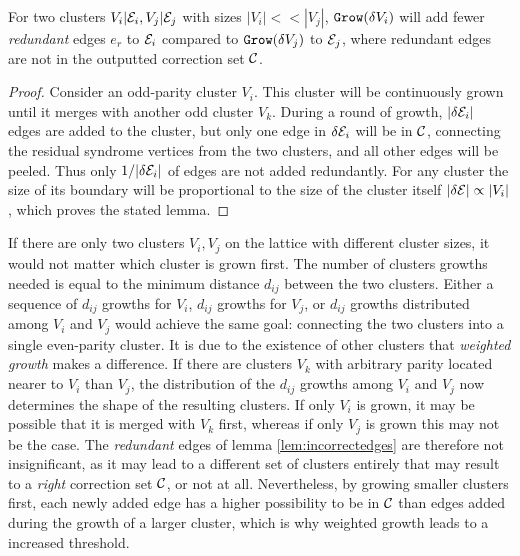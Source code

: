 

\begin{lemma}\label{lem:incorrectedges}
  For two clusters $V_i|\mathcal{E}_i, V_j|\mathcal{E}_j$ with sizes $|V_i| << |V_j|$, $\texttt{Grow}(\delta V_i)$ will add fewer \emph{redundant} edges $e_r$ to $\mathcal{E}_i$ compared to $\texttt{Grow}(\delta V_j)$ to $\mathcal{E}_j$, where redundant edges are not in the outputted correction set $\mathcal{C}$. 
\end{lemma}
\begin{proof}
  Consider an odd-parity cluster $V_i$. This cluster will be continuously grown until it merges with another odd cluster $V_k$. 
  During a round of growth, $|\delta \mathcal{E}_i|$ edges are added to the cluster, but only one edge in $\delta \mathcal{E}_i$ will be in $\mathcal{C}$, connecting the residual syndrome vertices from the two clusters, and all other edges will be peeled. Thus only $1/|\delta \mathcal{E}_i|$ of edges are not added redundantly. For any cluster the size of its boundary will be proportional to the size of the cluster itself $|\delta \mathcal{E}| \propto |V_i|$, which proves the stated lemma. 
\end{proof}

If there are only two clusters $V_i, V_j$ on the lattice with different cluster sizes, it would not matter which cluster is grown first. The number of clusters growths needed is equal to the minimum distance $d_{ij}$ between the two clusters. Either a sequence of $d_{ij}$ growths for $V_i$, $d_{ij}$ growths for $V_j$, or $d_{ij}$ growths distributed among $V_i$ and $V_j$ would achieve the same goal: connecting the two clusters into a single even-parity cluster. It is due to the existence of other clusters that \emph{weighted growth} makes a difference. If there are clusters $V_k$ with arbitrary parity located nearer to $V_i$ than $V_j$, the distribution of the $d_{ij}$ growths among $V_i$ and $V_j$ now determines the shape of the resulting clusters. If only $V_i$ is grown, it may be possible that it is merged with $V_k$ first, whereas if only $V_j$ is grown this may not be the case. The \emph{redundant} edges of lemma \ref{lem:incorrectedges} are therefore not insignificant, as it may lead to a different set of clusters entirely that may result to a \emph{right} correction set $\mathcal{C}$, or not at all. Nevertheless, by growing smaller clusters first, each newly added edge has a higher possibility to be in $\mathcal{C}$ than edges added during the growth of a larger cluster, which is why weighted growth leads to a increased threshold.


